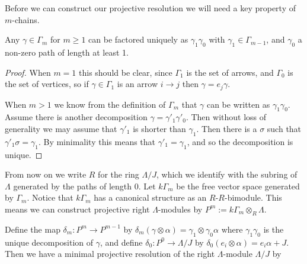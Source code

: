 Before we can construct our projective resolution we will need a key property of $m$-chains. 

\begin{lemma}\label{lem:unique_factorization_of_chains}
	Any $\gamma\in \Gamma_m$ for $m \geq 1$ can be factored uniquely as $\gamma_1\gamma_0$ with $\gamma_1 \in \Gamma_{m-1}$, and $\gamma_0$ a non-zero path of length at least 1.
	\begin{proof}
		When $m=1$ this should be clear, since $\Gamma_1$ is the set of arrows, and $\Gamma_0$ is the set of vertices, so if $\gamma \in \Gamma_1$ is an arrow $i\to j$ then $\gamma = e_j\gamma$.
		
		When $m > 1$ we know from the definition of $\Gamma_m$ that $\gamma$ can be written as $\gamma_1\gamma_0$. Assume there is another decomposition $\gamma = \gamma'_1\gamma'_0$. Then without loss of generality we may assume that $\gamma'_1$ is shorter than $\gamma_1$. Then there is a $\sigma$ such that $\gamma'_1\sigma = \gamma_1$. By minimality this means that $\gamma'_1=\gamma_1$, and so the decomposition is unique.
	\end{proof} 
\end{lemma} 

From now on we write $R$ for the ring $\Lambda/J$, which we identify with the subring of $\Lambda$ generated by the paths of length 0. Let $k\Gamma_m$ be the free vector space generated by $\Gamma_m$. Notice that $k\Gamma_m$ has a canonical structure as an $R$-$R$-bimodule. This means we can construct projective right $\Lambda$-modules by $P^m := k\Gamma_m\otimes_R\Lambda$.

\begin{prop}\label{prop:projective_res_of_top_monomial_alg}
Define the map $\delta_m \colon P^m \to P^{m-1}$ by $\delta_m(\gamma \otimes \alpha) = \gamma_1 \otimes \gamma_0\alpha$ where $\gamma_1\gamma_0$ is the unique decomposition of $\gamma$, and define $\delta_0 \colon P^0 \to \Lambda /J$ by $\delta_0(e_i\otimes \alpha) = e_i\alpha + J$. Then we have a minimal projective resolution of the right $\Lambda$-module $\Lambda/J$ by

\begin{center}
\end{center}
\end{prop}

